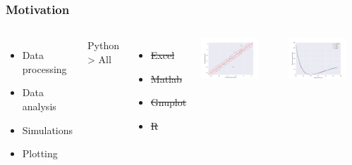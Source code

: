 \begin{frame}[fragile]

    \frametitle{Motivation}

    \begin{columns}[t]


            \begin{itemize}
                \item Data processing
                \item Data analysis
                \item Simulations
                \item Plotting
            \end{itemize}

            \bigskip

            Python > All
            \begin{itemize}
                \item \st{Excel}
                \item \st{Matlab}
                \item \st{Gnuplot}
                \item \st{R}
            \end{itemize}


            \centering

            \includegraphics[width=0.8\textwidth]{images/plot1.png}

            \includegraphics[width=0.8\textwidth]{images/plot2.png}

    \end{columns}

\end{frame}



